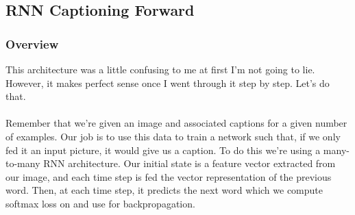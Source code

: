 \documentclass[12pt]{article}
\begin{document}
\subsection{RNN Captioning Forward}

\subsubsection{Overview}
This architecture was a little confusing to me at first I'm not going to lie. However, 
it makes perfect sense once I went through it step by step. Let's do that. 
~\\
~\\
Remember that we're given an image and associated captions for a given number of examples. 
Our job is to use this data to train a network such that, if we only fed it an input 
picture, it would give us a caption. To do this we're using a many-to-many RNN architecture. 
Our initial state is a feature vector extracted from our image, 
and each time step is fed the vector representation of the previous word. Then, at each time 
step, it predicts the next word which we compute softmax loss on and use for backpropagation. 
\end{document}
